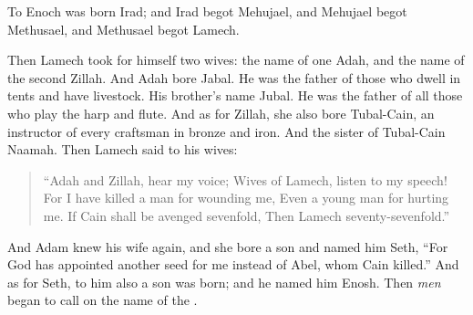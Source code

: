 \bverse To Enoch was born Irad; and Irad begot Mehujael, and Mehujael begot Methusael, and Methusael begot Lamech.

\bverse Then Lamech took for himself two wives: the name of one \was Adah, and the name of the second \was Zillah.
\bverse And Adah bore Jabal. He was the father of those who dwell in tents and have livestock.
\bverse His brother's name \was Jubal. He was the father of all those who play the harp and flute.
\bverse And as for Zillah, she also bore Tubal-Cain, an instructor of every craftsman in bronze and iron. And the sister of Tubal-Cain \was Naamah.
\bverse Then Lamech said to his wives:
\begin{quotation}
``Adah and Zillah, hear my voice; Wives of Lamech, listen to my speech! For I have killed a man for wounding me, Even a young man for hurting me. \bverse If Cain shall be avenged sevenfold, Then Lamech seventy-sevenfold.''
\end{quotation}


\bverse And Adam knew his wife again, and she bore a son and named him Seth, ``For God has appointed another seed for me instead of Abel, whom Cain killed.''
\bverse And as for Seth, to him also a son was born; and he named him Enosh. Then \textit{men} began to call on the name of the \lord.
